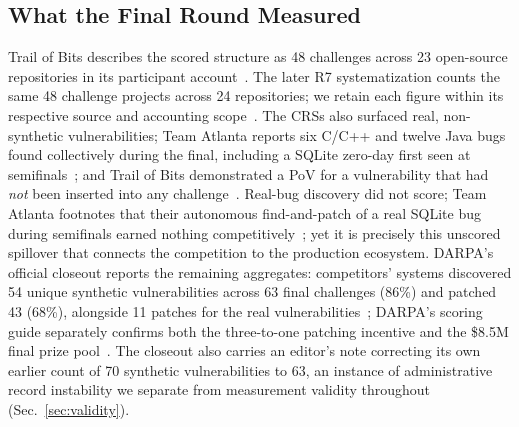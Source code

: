 \documentclass[conference,compsoc]{IEEEtran}
\begin{document}
\subsection{What the Final Round Measured}
Trail of Bits describes the scored structure as 48 challenges across 23 open-source
repositories in its participant account~\cite{tobbuttercup2025}. The later R7 systematization
counts the same 48 challenge projects across 24 repositories; we retain each figure within its
respective source and accounting scope~\cite{r7sokaixcc2026}. The CRSs also surfaced real,
non-synthetic vulnerabilities; Team Atlanta reports six C/C++ and twelve Java bugs found
collectively during the final, including a SQLite zero-day first seen at
semifinals~\cite{taafc2025}; and Trail of Bits demonstrated a PoV for a vulnerability that
had \emph{not} been inserted into any challenge~\cite{tobbuttercup2025}. Real-bug discovery did
not score; Team Atlanta footnotes that their autonomous find-and-patch of a real SQLite bug
during semifinals earned nothing competitively~\cite{taasc2024}; yet it is precisely this
unscored spillover that connects the competition to the production ecosystem. DARPA's official
closeout reports the remaining aggregates: competitors' systems discovered 54 unique synthetic
vulnerabilities across 63 final challenges (86\%) and patched 43 (68\%), alongside 11 patches for the real
vulnerabilities~\cite{darparesults2025}; DARPA's scoring guide separately confirms both the
three-to-one patching incentive and the \$8.5M final prize pool~\cite{darpascoring2025}. The
closeout also carries an editor's note correcting its own earlier count of 70 synthetic
vulnerabilities to 63, an instance of administrative record instability we separate from
measurement validity throughout (Sec.~\ref{sec:validity}).
\end{document}
